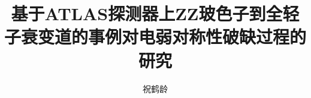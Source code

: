 \documentclass[doctor,english,pdf]{ustcthesis}
\title{基于ATLAS探测器上ZZ玻色子到全轻子衰变道的事例对电弱对称性破缺过程的研究}
\author{祝鹤龄}
\begin{document}
\maketitle

\frontmatter


\tableofcontents
\listoffigures
\listoftables

\makededicate
\newpage

\mainmatter









\appendix
%

\backmatter
%
\end{document}
